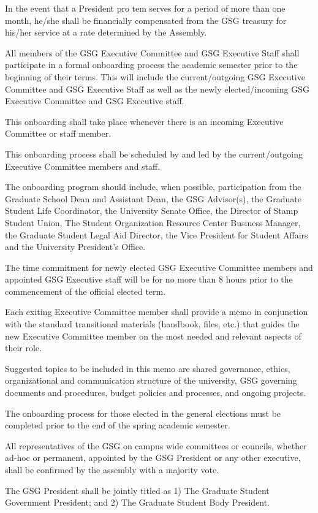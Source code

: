 \begin{bylaws-number}
\begin{bylaws-number}
    \item In the event that a President pro tem serves for a period of more than one month, he/she shall be financially compensated from the GSG treasury for his/her service at a rate determined by the Assembly.
  \end{bylaws-number}
  \item All members of the GSG Executive Committee and GSG Executive Staff shall participate in a formal onboarding process the academic semester prior to the beginning of their terms. This will include the current/outgoing GSG Executive Committee and GSG Executive Staff as well as the newly elected/incoming GSG Executive Committee and GSG Executive staff.
  \begin{bylaws-number}
  	\item This onboarding shall take place whenever there is an incoming Executive Committee or staff member.
  	\item This onboarding process shall be scheduled by and led by the current/outgoing Executive Committee members and staff.
  	\item The onboarding program should include, when possible, participation from the Graduate School Dean and Assistant Dean, the GSG Advisor(s), the Graduate Student Life Coordinator, the University Senate Office, the Director of Stamp Student Union, The Student Organization Resource Center Business Manager, the Graduate
  	Student Legal Aid Director, the Vice President for Student Affairs and the University President’s Office.
  	\item The time commitment for newly elected GSG Executive Committee members and appointed GSG Executive staff will be for no more than 8 hours prior to the commencement of the official elected term.
  	\item Each exiting Executive Committee member shall provide a memo in conjunction with the standard transitional materials (handbook, files, etc.) that guides the new Executive Committee member on the most needed and relevant aspects of their role.
  	\begin{bylaws-number}
  	  \item Suggested topics to be included in this memo are shared
  	  governance, ethics, organizational and communication structure of the university, GSG
  	  governing documents and procedures, budget policies and processes, and ongoing
  	  projects.
  	\end{bylaws-number}
  	\item The onboarding process for those elected in the general elections must be completed prior to the end of the spring academic semester.
  \end{bylaws-number}
  \item All representatives of the GSG on campus wide committees or councils, whether ad-hoc or permanent, appointed by the GSG President or any other executive, shall be confirmed by the assembly with a majority vote.
  \item The GSG President shall be jointly titled as 1) The Graduate Student Government President; and 2) The Graduate Student Body President.
\end{bylaws-number}

